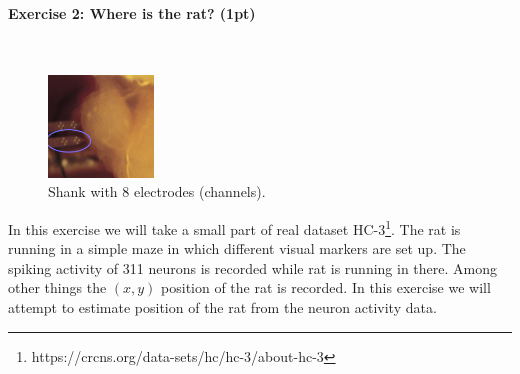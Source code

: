 \documentclass[a4paper,11pt]{article}
\newenvironment{exercise}[3]{\paragraph{Exercise #1: #2 (#3pt)}\ \\}{
\medskip}
\begin{document}
%
%
\begin{exercise}{2}{Where is the rat?}{1}
\begin{figure}
	\centering
	\vspace{-12pt}
	\includegraphics[width=0.25\textwidth]{shank.jpg}
	\caption{Shank with 8 electrodes (channels).}
	\label{fig:shank}
	\vspace{-10pt}
\end{figure}
In this exercise we will take a small part of real dataset HC-3\footnote{https://crcns.org/data-sets/hc/hc-3/about-hc-3}. The rat is running in a simple maze in which different visual markers are set up. The spiking activity of 311 neurons is recorded while rat is running in there. Among other things the $(x, y)$ position of the rat is recorded. In this exercise we will attempt to estimate position of the rat from the neuron activity data.


\end{exercise}
\end{document}
